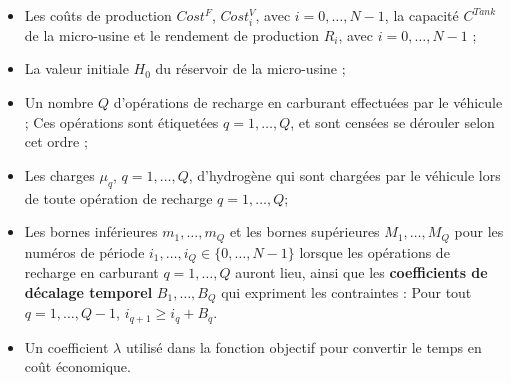 \begin{itemize}[label=$\square$]
	\item Les coûts de production $Cost^F$, $Cost^V_i$, avec $i = 0, \dots,N-1$, la capacité $C^{Tank}$ de la micro-usine et le rendement de production $R_i$, avec $i = 0, \dots,N-1$ ;
	\item La valeur initiale $H_0$ du réservoir de la micro-usine ;
		\item Un nombre $Q$ d'opérations de recharge en carburant effectuées par le véhicule ; Ces opérations sont étiquetées $q = 1, \dots, Q$, et sont censées se dérouler selon cet ordre ;
	\item Les charges $\mu_q$, $q= 1, \dots, Q$, d'hydrogène qui sont chargées par le véhicule lors de toute opération de recharge $q = 1, \dots, Q $;     
	\item Les bornes inférieures $m_1,\dots, m_Q$ et les bornes supérieures $M_1,\dots,M_Q$ pour les numéros de période $i_1,\dots, i_Q \in \{0,\dots, N-1\}$ lorsque les opérations de recharge en carburant $q = 1, \dots, Q$ auront lieu, ainsi que les \textbf{coefficients de décalage temporel} $B_1, \dots, B_Q$ qui expriment les contraintes :  Pour tout $q = 1, \dots, Q-1$, $i_{q+1} \geq i_q + B_q$. 
	\item Un coefficient $\lambda$ utilisé dans la fonction objectif pour convertir le temps en coût économique.
\end{itemize}


